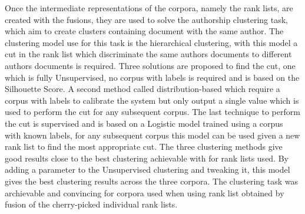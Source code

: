Once the intermediate representations of the corpora, namely the rank lists, are created with the fusions, they are used to solve the authorship clustering task, which aim to create clusters containing document with the same author.
The clustering model use for this task is the hierarchical clustering, with this model a cut in the rank list which discriminate the same authors documents to different authors documents is required.
Three solutions are proposed to find the cut, one which is fully Unsupervised, no corpus with labels is required and is based on the Silhouette Score.
A second method called distribution-based which require a corpus with labels to calibrate the system but only output a single value which is used to perform the cut for any subsequent corpus.
The last technique to perform the cut is supervised and is based on a Logistic model trained using a corpus with known labels, for any subsequent corpus this model can be used given a new rank list to find the most appropriate cut.
The three clustering methods give good results close to the best clustering achievable with for rank lists used.
By adding a parameter to the Unsupervised clustering and tweaking it, this model gives the best clustering results across the three corpora.
The clustering task was archievable and convincing for corpora used when using rank list obtained by fusion of the cherry-picked individual rank lists.
